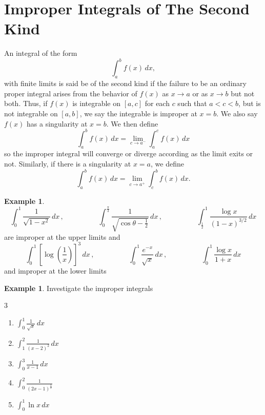 \documentclass[12pt,a4paper]{report}
\theoremstyle{definition}
\newtheorem{exa}[thm]{Example}
\theoremstyle{plain}
\begin{document}
\section{Improper Integrals of The Second Kind}
An integral of the form $$\int_a^b f(x)\, dx,$$ with finite limits is said be  of the second kind if the failure to be an ordinary proper integral arises from the behavior of $f(x)$ as $x\rightarrow a$ or as $x\rightarrow b$ but not both. Thus, if $f(x)$ is integrable on $[a,c]$ for each $c$ such that $a<c<b$, but is not integrable on $[a,b]$, we say the integrable is improper at $x = b$. We also say $f(x)$ has a singularity at $x = b$. We then define $$\int_a^bf(x)\, dx = \lim_{c\rightarrow a^-}\int_a^cf(x)\, dx$$ so the improper integral will converge or diverge according as the limit exits or not. Similarly, if there is a singularity at $x = a$, we define $$\int_a^bf(x)\, dx = \lim_{c\rightarrow a^+}\int_c^bf(x)\, dx.$$



\begin{exa}
$$\int_0^1\frac{1}{\sqrt{1 - x^2}}\, dx\, , \hspace{2cm} \int_0^{\frac{\pi}{3}}\frac{1}{\sqrt{\cos\theta - \frac{1}{2}}}\, dx\, , \hspace{2cm} \int^1_{\frac{1}{2}}\frac{\log x}{(1 - x)^{3/2}}\, dx$$
are improper at the upper limits and 
$$\int_0^1\left[\log\left(\frac{1}{x}\right)\right]^3\, dx \, , \hspace{2cm} \int_0^1\frac{e^{-x}}{\sqrt{x}}\, dx\, , \hspace{2cm} \int_0^1\frac{\log x}{1 + x}\, dx$$
and improper at the lower limits
\end{exa}




\begin{exa}
Investigate the improper integrals
\begin{multicols}{3}
\begin{enumerate}
\item[(a).]$\displaystyle{\int_0^1\frac{1}{\sqrt{x}}\, dx}$
\item[(b).]$\displaystyle{\int_1^2\frac{1}{(x - 2)^2}\, dx}$
\item[(c).]$\displaystyle{\int_0^3\frac{1}{x - 1}\, dx}$
\item[(d).]$\displaystyle{\int_0^2\frac{1}{(2x - 1)^{\frac{2}{3}}}}$
\item[(e).]$\displaystyle{\int_0^1 \ln x\, dx}$
\end{enumerate}
\end{multicols}
\end{exa}
\end{document}
